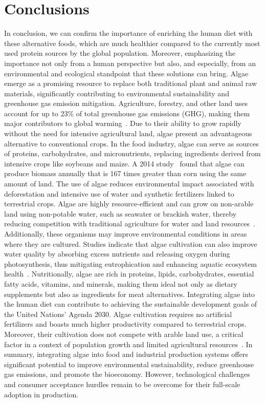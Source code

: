 \section{Conclusions}
In conclusion, we can confirm the importance of enriching the human diet with these alternative foods, which are much healthier compared to the currently most used protein sources by the global population. Moreover, emphasizing the importance not only from a human perspective but also, and especially, from an environmental and ecological standpoint that these solutions can bring. Algae emerge as a promising resource to replace both traditional plant and animal raw materials, significantly contributing to environmental sustainability and greenhouse gas emission mitigation. Agriculture, forestry, and other land uses account for up to 23\% of total greenhouse gas emissions (GHG), making them major contributors to global warming~\parencite{gonzalez_Meat_2020}.
Due to their ability to grow rapidly without the need for intensive agricultural land, algae present an advantageous alternative to conventional crops. In the food industry, algae can serve as sources of proteins, carbohydrates, and micronutrients, replacing ingredients derived from intensive crops like soybeans and maize. A 2014 study~\parencite{ullah_Algal_2014} found that algae can produce biomass annually that is 167 times greater than corn using the same amount of land. The use of algae reduces environmental impact associated with deforestation and intensive use of water and synthetic fertilizers linked to terrestrial crops. Algae are highly resource-efficient and can grow on non-arable land using non-potable water, such as seawater or brackish water, thereby reducing competition with traditional agriculture for water and land resources~\parencite{diaz_Developing_2023}.
Additionally, these organisms may improve environmental conditions in areas where they are cultured. Studies indicate that algae cultivation can also improve water quality by absorbing excess nutrients and releasing oxygen during photosynthesis, thus mitigating eutrophication and enhancing aquatic ecosystem health~\parencite{espinosa-ramirez_Algae_2023}. Nutritionally, algae are rich in proteins, lipids, carbohydrates, essential fatty acids, vitamins, and minerals, making them ideal not only as dietary supplements but also as ingredients for meat alternatives. Integrating algae into the human diet can contribute to achieving the sustainable development goals of the United Nations' Agenda 2030. Algae cultivation requires no artificial fertilizers and boasts much higher productivity compared to terrestrial crops. Moreover, their cultivation does not compete with arable land use, a critical factor in a context of population growth and limited agricultural resources~\parencite{boukid_Algae_2022}. In summary, integrating algae into food and industrial production systems offers significant potential to improve environmental sustainability, reduce greenhouse gas emissions, and promote the bioeconomy. However, technological challenges and consumer acceptance hurdles remain to be overcome for their full-scale adoption in production.